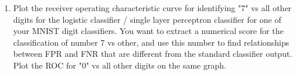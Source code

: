 \documentclass[12pt]{book}
\theoremstyle{definition}
\begin{document}
\begin{enumerate}
\item
Plot the receiver operating characteristic curve for identifying "7" vs all other digits for the logistic classifier / single layer perceptron classifier for one of your MNIST digit classifiers.    You want to extract a numerical score for the classification of number 7 vs other, and use this number to find relationships between FPR and FNR that are different from the standard classifier output.  Plot the ROC for "0" vs all other digits on the same graph.  
\end{enumerate}
\end{document}
